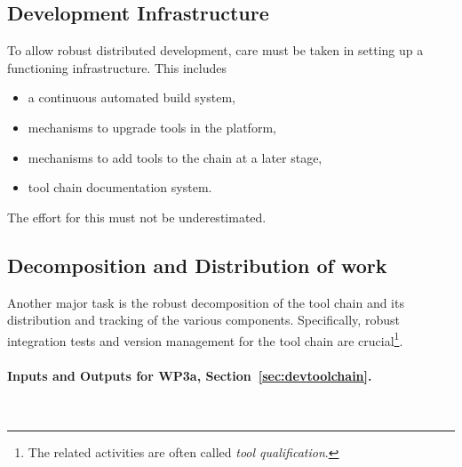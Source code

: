 \documentclass{template/openetcs_article}
\begin{document}
\subsection{Development Infrastructure}

To allow robust distributed development, care must be taken in setting up a functioning infrastructure.  This includes 
\begin{itemize}
\item a continuous automated build system, 
\item mechanisms to upgrade tools in the platform, 
\item mechanisms to add tools to the chain at a later stage,
\item tool chain documentation system. 
\end{itemize}
 The effort for this must not be underestimated.

\subsection{Decomposition and Distribution of work}

Another major task is the robust decomposition of the tool chain and its 
distribution and tracking of the various components.  
Specifically, robust integration tests and version management for the tool chain are crucial\footnote{The related activities are often called {\it tool qualification}.}.



\paragraph{Inputs and Outputs for WP3a, Section~\ref{sec:devtoolchain}.}{~}\newline
\end{document}
